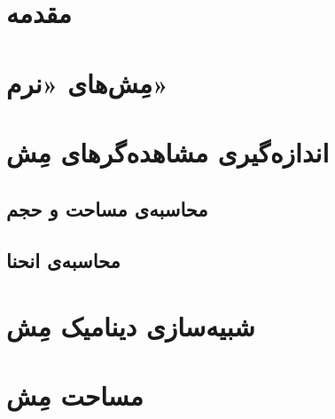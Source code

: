 \setRL
\clearpage
\def \MemRes {\Mempath /MembraneResults}

\section{
مقدمه
}


\section{\label{sec:Soft meshes}
مِش‌های «نرم»
}






\section{\label{sec:MeshObservables}
اندازه‌گیری مشاهده‌گر‌های مِش
}
\subsection{\label{sec:areaVolumeCalculation}
محاسبه‌ی مساحت و حجم
}


%


\subsection{\label{sec:curvatureCalculation}
محاسبه‌ی انحنا
}


\section{\label{sec:Results DAR MD}
شبیه‌سازی دینامیک مِش
}










%


\section{\label{sec:resultsArea}
مساحت مِش
}




